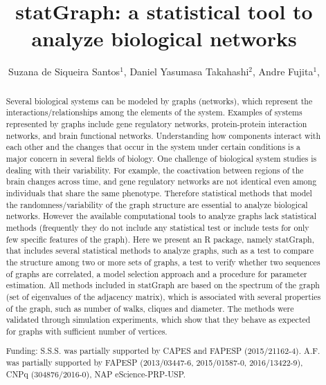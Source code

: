 \documentclass[twoside]{article}
\title{\vspace{-15mm}\fontsize{24pt}{10pt}\selectfont\textbf{ statGraph: a statistical tool to analyze biological networks }} %
\author{ Suzana de Siqueira Santos$^{1}$, Daniel Yasumasa Takahashi$^{2}$, Andre Fujita$^{1}$, }
\affil{ 1 IME - USP

2 Department of Psychology and Neuroscience Institute Princeton University

 }
\date{}
\begin{document}
  
  
  \maketitle %
  
  
  \thispagestyle{fancy} %
  
  
  \begin{abstract}
  Several biological systems can be modeled by graphs (networks), which represent the interactions/relationships among the elements of the system. Examples of systems represented by graphs include gene regulatory networks, protein-protein interaction networks, and brain functional networks. Understanding how components interact with each other and the changes that occur in the system under certain conditions is a major concern in several fields of biology. One challenge of biological system studies is dealing with their variability. For example, the coactivation between regions of the brain changes across time, and gene regulatory networks are not identical even among individuals that share the same phenotype. Therefore statistical methods that model the randomness/variability of the graph structure are essential to analyze biological networks. However the available computational tools to analyze graphs lack statistical methods (frequently they do not include any statistical test or include tests for only few specific features of the graph). Here we present an R package, namely statGraph, that includes several statistical methods to analyze graphs, such as a test to compare the structure among two or more sets of graphs, a test to verify whether two sequences of graphs are correlated, a model selection approach and a procedure for parameter estimation. All methods included in statGraph are based on the spectrum of the graph (set of eigenvalues of the adjacency matrix), which is associated with several properties of the graph, such as number of walks, cliques and diameter. The methods were validated through simulation experiments, which show that they behave as expected for graphs with sufficient number of vertices.
  
  Funding: S.S.S. was partially supported by CAPES and FAPESP (2015/21162-4). A.F. was partially supported by FAPESP (2013/03447-6, 2015/01587-0, 2016/13422-9), CNPq (304876/2016-0), NAP eScience-PRP-USP. \\ 
  \end{abstract}
  
\end{document}
